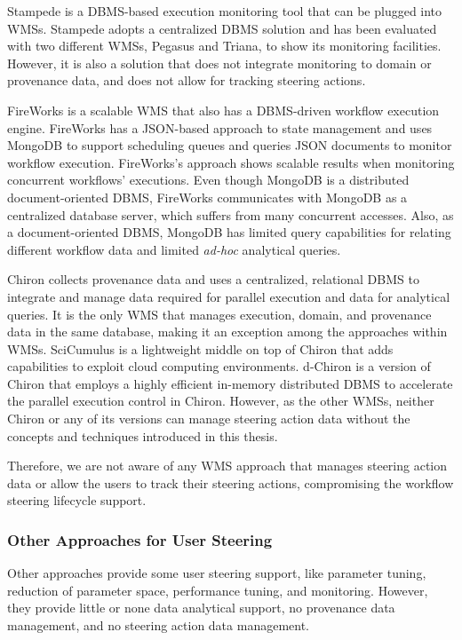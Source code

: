 Stampede \cite{Gunter2011Online} is a DBMS-based
execution monitoring tool that can be plugged into WMSs. Stampede adopts
a centralized DBMS solution and has been evaluated with two different
WMSs, Pegasus and Triana, to show its monitoring facilities. However, it
is also a solution that does not integrate monitoring to domain or
provenance data, and does not allow for tracking steering actions.

FireWorks is a scalable WMS \cite{Jain2015FireWorks:}
that also has a DBMS-driven workflow execution engine. FireWorks has a
JSON-based approach to state management and uses MongoDB to support
scheduling queues and queries JSON documents to monitor workflow
execution. FireWorks's approach shows scalable results when monitoring
concurrent workflows' executions. Even though MongoDB is a distributed
document-oriented DBMS, FireWorks communicates with MongoDB as a centralized
database server, which suffers from many concurrent accesses. Also, as a document-oriented DBMS, MongoDB has limited query
capabilities for relating different workflow data and limited
\emph{ad-hoc} analytical queries.

Chiron \cite{Ogasawara2011algebraic, Dias2015Data-centric}
collects provenance data and uses a centralized, relational DBMS to
integrate and manage data required for parallel execution and data for
analytical queries. It is the only WMS that manages execution, domain, and provenance data in the same database, making it an exception among the approaches within WMSs.
SciCumulus \cite{Oliveira2010SciCumulus:} is a lightweight middle on top of Chiron that adds capabilities to exploit cloud computing environments.
d-Chiron \cite{souza_controlling_2015_thesis,Souza2015Parallel}
is a version of Chiron that employs a highly efficient in-memory distributed DBMS to accelerate the parallel execution control in Chiron. However, as the other WMSs, neither Chiron or any of its versions can manage steering action data without the concepts and techniques introduced in this thesis.


Therefore, we are not aware of any WMS approach that manages steering action data or allow the users to track their steering actions, compromising the workflow steering lifecycle support.


\subsubsection{Other Approaches for User Steering}

Other approaches \cite{Reyes2010Monitoring,Matkovic2014Visual,Cordasco2013Designing}
provide some user steering support, like parameter tuning,
reduction of parameter space, performance tuning, and monitoring.
However, they provide little or none data analytical support, no provenance data
management, and no steering action data management.

